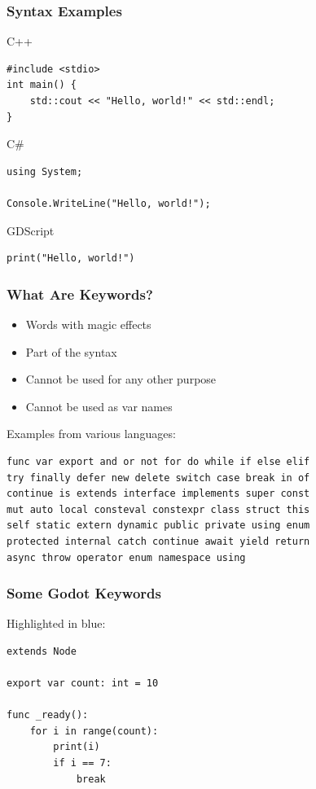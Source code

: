 \documentclass{beamer}
\newenvironment{xframe}[2][]
{
    \begin{frame}[fragile,environment=xframe,#1]
    \frametitle{#2}
}{
    \end{frame}
}
\begin{document}
\begin{xframe}{Syntax Examples}

    C++
    \begin{verbatim}
#include <stdio>
int main() {
    std::cout << "Hello, world!" << std::endl;
}
    \end{verbatim}

    C\#
    \begin{verbatim}
using System;

Console.WriteLine("Hello, world!");
    \end{verbatim}

    GDScript
    \begin{verbatim}
print("Hello, world!")
    \end{verbatim}

\end{xframe}

\begin{xframe}{What Are Keywords?}
    \begin{itemize}
        \item Words with magic effects
        \item Part of the syntax
        \item Cannot be used for any other purpose
        \item Cannot be used as var names
    \end{itemize}

    \pause
    \bigskip

    Examples from various languages:
    \begin{verbatim}
func var export and or not for do while if else elif
try finally defer new delete switch case break in of
continue is extends interface implements super const
mut auto local consteval constexpr class struct this
self static extern dynamic public private using enum
protected internal catch continue await yield return
async throw operator enum namespace using
    \end{verbatim}

\end{xframe}


\begin{xframe}{Some Godot Keywords}
    Highlighted in blue:
    \begin{verbatim}
extends Node

export var count: int = 10

func _ready():
    for i in range(count):
        print(i)
        if i == 7:
            break
    \end{verbatim}

\end{xframe}
\end{document}

